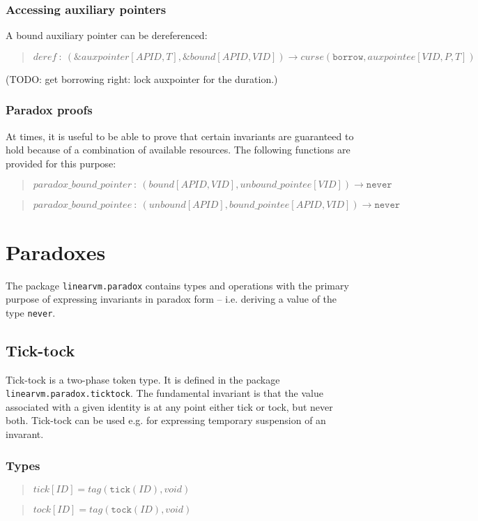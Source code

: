\documentclass[a4paper]{book}
\newcommand\TypeDefinition[1]{\begin{quote}$\mathit{#1}$\end{quote}}
\newcommand\FuncSignature[2]{\begin{quote}$\mathit{#1}\ :\ \mathit{#2}$\end{quote}}
\begin{document}
\subsection*{Accessing auxiliary pointers}

A bound auxiliary pointer can be dereferenced:

\FuncSignature{deref}{
  (\&auxpointer[APID,T], \&bound[APID,VID])
  \to
  curse(\mathtt{borrow}, auxpointee[VID,P,T])}

(TODO: get borrowing right: lock auxpointer for the duration.)



\subsection*{Paradox proofs}

At times, it is useful to be able to prove that certain invariants are
guaranteed to hold because of a combination of available resources.
The following functions are provided for this purpose:

\FuncSignature{paradox\_bound\_pointer}{
  (bound[APID,VID], unbound\_pointee[VID]) \to \mathtt{never}}
\FuncSignature{paradox\_bound\_pointee}{
  (unbound[APID], bound\_pointee[APID,VID]) \to \mathtt{never}}

\chapter{Paradoxes}
The package \texttt{linearvm.paradox} contains types and operations
with the primary purpose of expressing invariants in paradox form --
i.e. deriving a value of the type \texttt{never}.

\section{Tick-tock}
Tick-tock is a two-phase token type.
It is defined in the package \texttt{linearvm.paradox.ticktock}.
The fundamental invariant is that the value associated with a given identity
is at any point either tick or tock, but never both.
Tick-tock can be used e.g. for expressing temporary suspension of an invarant.

\subsection*{Types}
\TypeDefinition{tick[ID] = tag(\texttt{tick}(ID), void)}
\TypeDefinition{tock[ID] = tag(\texttt{tock}(ID), void)}
\end{document}
